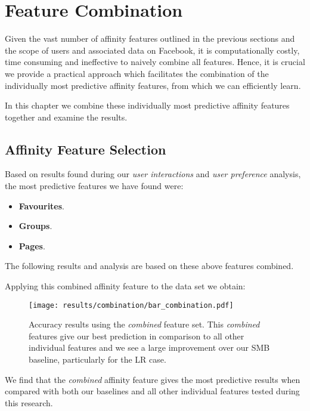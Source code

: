 
\chapter{Feature Combination}
\label{cha:bma}

Given the vast number of affinity features outlined in the previous sections and the scope of users and associated data on Facebook, it is computationally costly, time 
consuming and ineffective to naively combine all features. Hence, it is crucial we provide a practical approach which 
facilitates the combination of the individually most predictive affinity features, from which we can efficiently learn.

In this chapter we combine these individually most predictive affinity features together and examine the results.

\section{Affinity Feature Selection}
\label{sec:notation}

Based on results found during our \emph{user interactions} and \emph{user preference} analysis, the most predictive features we have found were:
\begin{itemize}
\item \textbf{Favourites}.
\item \textbf{Groups}.
\item \textbf{Pages}.
\end{itemize}

The following results and analysis are based on these above features combined.

\clearpage

Applying this combined affinity feature to the data set we obtain:

\begin{figure}[h]
	\begin{center}
		\texttt{[image: results/combination/bar\_combination.pdf]}
		\caption{Accuracy results using the \emph{combined} feature set. This \emph{combined} features give our best prediction 
		in comparison to all other individual features and we see a large improvement over our SMB baseline, particularly for the LR case.}
	\end{center}
\end{figure}

\clearpage

We find that the \emph{combined} affinity feature gives the most predictive results when compared with both our baselines and all
other individual features tested during this research.

